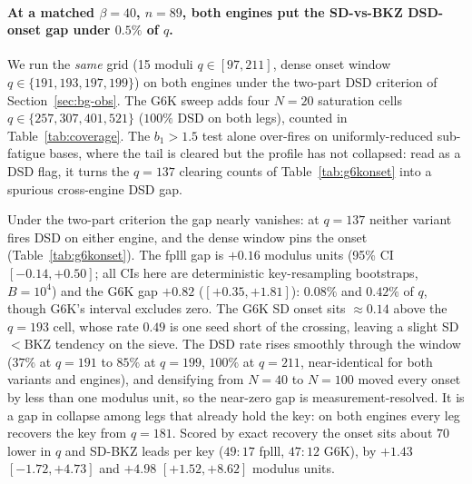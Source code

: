 \documentclass[journal=cic,version=preprint]{iacrj}
\begin{document}
\paragraph{At a matched $\beta=40$, $n=89$, both engines put the SD-vs-BKZ DSD-onset gap under $0.5\%$ of $q$.}
We run the \emph{same} grid (15 moduli $q\in[97,211]$, dense onset window
$q\in\{191,193,197,199\}$) on both engines under the two-part DSD criterion of
Section~\ref{sec:bg-obs}. The G6K sweep adds four $N=20$ saturation cells
$q\in\{257,307,401,521\}$ ($100\%$ DSD on both legs), counted in Table~\ref{tab:coverage}. The $b_1>1.5$ test alone
over-fires on uniformly-reduced sub-fatigue bases, where the tail is cleared
but the profile has not collapsed: read as a DSD flag, it turns the $q=137$
clearing counts of Table~\ref{tab:g6konset} into a spurious cross-engine DSD
gap.

Under the two-part criterion the gap nearly vanishes: at $q=137$ neither
variant fires DSD on either engine, and the dense window pins the onset
(Table~\ref{tab:g6konset}). The fplll gap is $+0.16$ modulus units (95\% CI
$[-0.14, +0.50]$; all CIs here are deterministic key-resampling bootstraps,
$B=10^{4}$) and the G6K gap $+0.82$ ($[+0.35, +1.81]$): $0.08\%$ and
$0.42\%$ of $q$, though G6K's interval excludes zero. The G6K SD onset sits ${\approx}0.14$ above the
$q=193$ cell, whose rate $0.49$ is one seed short of the crossing, leaving a
slight SD$<$BKZ tendency on the sieve. The DSD rate rises smoothly through the
window ($37\%$ at $q=191$ to $85\%$ at $q=199$, $100\%$ at $q=211$,
near-identical for both variants and engines), and densifying from $N=40$ to
$N=100$ moved every onset by less than one modulus unit, so the near-zero gap is
measurement-resolved. It is a gap in collapse among legs that already hold
the key: on both engines every leg recovers the key from $q=181$. Scored by
exact recovery the onset sits about $70$ lower in $q$ and SD-BKZ leads per
key ($49{:}17$ fplll, $47{:}12$ G6K), by $+1.43$ $[-1.72,+4.73]$ and $+4.98$
$[+1.52,+8.62]$ modulus units.
\end{document}
